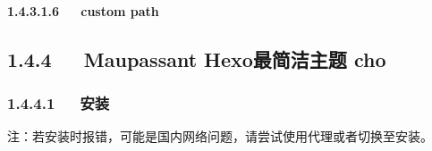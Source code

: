 \documentclass[letterpaper,12pt,english]{sphinxmanual}
\begin{document}
\paragraph{1.4.3.1.6   custom path}
\label{\detokenize{001software/001install/001._u7f51_u7ad9/hexo:custom-path}}

\subsection{1.4.4   Maupassant \sphinxhyphen{} Hexo最简洁主题 \sphinxhyphen{} cho}
\label{\detokenize{001software/001install/001._u7f51_u7ad9/hexo:maupassant-hexo-cho}}


\subsubsection{1.4.4.1   安装}
\label{\detokenize{001software/001install/001._u7f51_u7ad9/hexo:id6}}
注：若安装时报错，可能是国内网络问题，请尝试使用代理或者切换至安装。 
\end{document}
